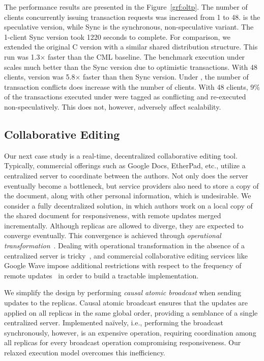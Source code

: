 The performance results are presented in the Figure~\ref{grf:oltp}. The number
of clients concurrently issuing transaction requests was increased from 1 to
48. \rxcml is the speculative version, while Sync is the synchronous,
non-speculative variant. The 1-client Sync version took 1220 seconds to
complete. For comparison, we extended the original C version with a similar
shared distribution structure. This run was 1.3$\times$ faster than the CML
baseline. The benchmark execution under \rxcml scales much better than the
Sync version due to optimistic transactions. With 48 clients, \rxcml version
was 5.8$\times$ faster than then Sync version. Under \rxcml, the number of
transaction conflicts does increase with the number of clients. With 48
clients, 9\% of the transactions executed under \rxcml were tagged as
conflicting and re-executed non-speculatively.  This does not, however,
adversely affect scalability.

\subsection{Collaborative Editing}

Our next case study is a real-time, decentralized collaborative editing tool.
Typically, commercial offerings such as Google Docs, EtherPad, etc., utilize a
centralized server to coordinate between the authors. Not only does the server
eventually become a bottleneck, but service providers also need to store a copy
of the document, along with other personal information, which is undesirable.
We consider a fully decentralized solution, in which authors work on a local
copy of the shared document for responsiveness, with remote updates merged
incrementally. Although replicas are allowed to diverge, they are expected to
converge eventually. This convergence is achieved through \emph{operational
transformation}~\cite{SuleimanGroup97}. Dealing with operational transformation
in the absence of a centralized server is tricky~\cite{Nichols95}, and
commercial collaborative editing services like Google Wave impose additional
restrictions with respect to the frequency of remote updates~\cite{Wave} in
order to build a tractable implementation.

We simplify the design by performing \emph{causal atomic broadcast} when
sending updates to the replicas. Causal atomic broadcast ensures that the
updates are applied on all replicas in the same global order, providing a
semblance of a single centralized server.  Implemented na\"{i}vely, i.e.,
performing the broadcast synchronously, however, is an expensive operation,
requiring coordination among all replicas for every broadcast operation
compromising responsiveness. Our relaxed execution model overcomes this
inefficiency.

